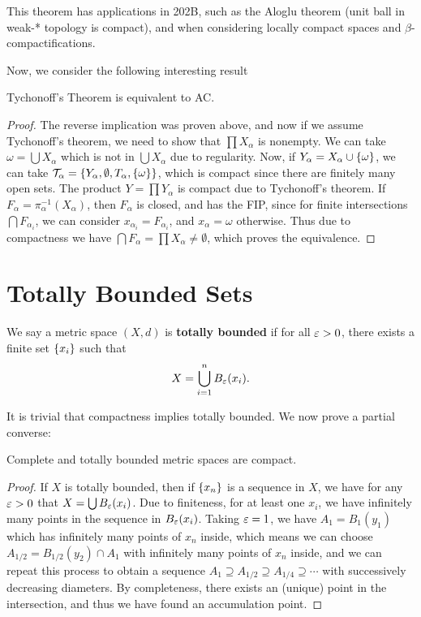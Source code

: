 This theorem has applications in 202B, such as the Aloglu theorem (unit ball in weak-* topology is compact), and when considering locally compact spaces and $\beta$-compactifications.

Now, we consider the following interesting result 

\begin{theorem}[Kelley]
    Tychonoff's Theorem is equivalent to AC.
\end{theorem}

\begin{proof}
    The reverse implication was proven above, and now if we assume Tychonoff's theorem, we need to show that $\prod X_\alpha$ is nonempty. We can take $\omega = \bigcup X_\alpha$ which is not in $\bigcup X_\alpha$ due to regularity. Now, if $Y_\alpha = X_\alpha \cup \qty{\omega}$, we can take $\mathcal T_\alpha = \qty{Y_\alpha, \emptyset, T_\alpha, \qty{\omega}}$, which is compact since there are finitely many open sets. The product $Y = \prod Y_\alpha$ is compact due to Tychonoff's theorem. If $F_\alpha = \pi_\alpha^{-1}(X_\alpha)$, then $F_\alpha$ is closed, and has the FIP, since for finite intersections $\bigcap F_{\alpha_i}$, we can consider $x_{\alpha_i} = F_{\alpha_i}$, and $x_\alpha = \omega$ otherwise. Thus due to compactness we have $\bigcap F_\alpha = \prod X_\alpha \ne \emptyset$, which proves the equivalence.
\end{proof}

\section{Totally Bounded Sets}

\begin{definition}
    We say a metric space $(X, d)$ is \textbf{totally bounded} if for all $\varepsilon > 0$, there exists a finite set $\qty{x_i}$ such that \[X = \bigcup_{i = 1}^n B_\varepsilon(x_i).\]
\end{definition}

It is trivial that compactness implies totally bounded. We now prove a partial converse:

\begin{theorem}
    Complete and totally bounded metric spaces are compact.
\end{theorem}

\begin{proof}
    If $X$ is totally bounded, then if $\qty{x_n}$ is a sequence in $X$, we have for any $\varepsilon > 0$ that $X = \bigcup B_\varepsilon(x_i)$. Due to finiteness, for at least one $x_i$, we have infinitely many points in the sequence in $B_\varepsilon(x_i)$. Taking $\varepsilon = 1$, we have $A_1 = B_1(y_1)$ which has infinitely many points of $x_n$ inside, which means we can choose $A_{1/2} = B_{1/2}(y_2) \cap A_1$ with infinitely many points of $x_n$ inside, and we can repeat this process to obtain a sequence $A_1 \supseteq A_{1/2} \supseteq A_{1/4} \supseteq \cdots$ with successively decreasing diameters. By completeness, there exists an (unique) point in the intersection, and thus we have found an accumulation point.
\end{proof}

